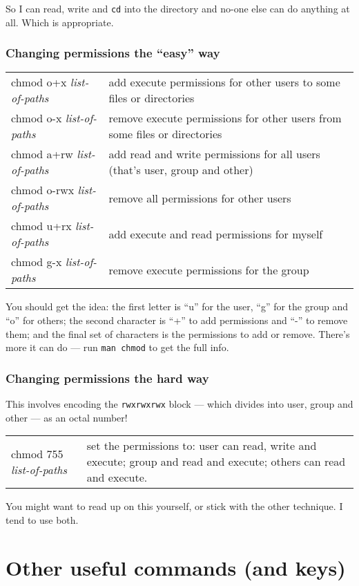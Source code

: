 \documentclass[twocolumn]{article}
\begin{document}
So I can read, write and \texttt{cd} into the directory and no-one
else can do anything at all. Which is appropriate.

\subsubsection{Changing permissions the ``easy'' way}
\begin{tabular}{l|p{2in}}
chmod o+x \emph{list-of-paths} & add execute permissions for other users to some files or directories\\
chmod o-x \emph{list-of-paths} & remove execute permissions for other users from some files or directories\\
chmod a+rw \emph{list-of-paths} & add read and write permissions for all users (that's user, group and other)\\
chmod o-rwx \emph{list-of-paths} & remove all permissions for other users\\
chmod u+rx \emph{list-of-paths} & add execute and read permissions for myself\\
chmod g-x \emph{list-of-paths} & remove execute permissions for the group
\end{tabular}
You should get the idea: the first letter is ``u'' for the user, ``g'' for
the group and ``o'' for others; the second character is ``+'' to add
permissions and ``-'' to remove them; and the final set of characters is
the permissions to add or remove. There's more it can do --- run
\verb+man chmod+ to get the full info.

\subsubsection{Changing permissions the hard way}
This involves encoding the \texttt{rwxrwxrwx} block --- which divides into
user, group and other --- as an octal number! 
\begin{tabular}{l|p{2in}}
chmod 755 \emph{list-of-paths} & set the permissions to: user can read, write
and execute; group and read and execute; others can read and execute.
\end{tabular}
You might want to read up on this yourself, or stick with the other technique.
I tend to use both.

\section{Other useful commands (and keys)}
\end{document}
